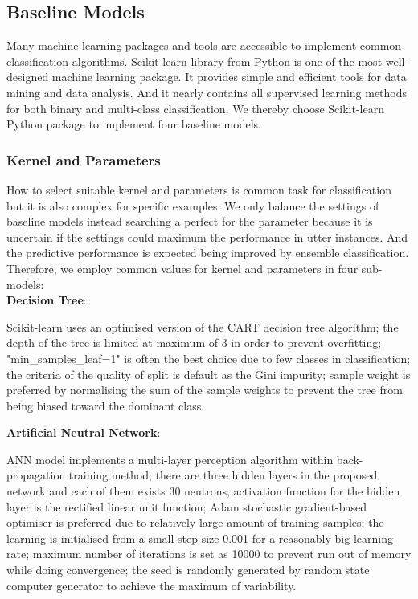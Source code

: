 \documentclass[10pt,journal,compsoc]{IEEEtran}
\begin{document}
\subsection{Baseline Models}
Many machine learning packages and tools are accessible to implement common classification algorithms. Scikit-learn library from Python is one of the most well-designed machine learning package. It provides simple and efficient tools for data mining and data analysis. And it nearly contains all supervised learning methods for both binary and multi-class classification. We thereby choose Scikit-learn Python package to implement four baseline models.

\subsubsection{Kernel and Parameters}
How to select suitable kernel and parameters is common task for classification but it is also complex for specific examples. We only balance the settings of baseline models instead searching a perfect for the parameter because it is uncertain if the settings could maximum the performance in utter instances. And the predictive performance is expected being improved by ensemble classification. Therefore, we employ common values for kernel and parameters in four sub-models:\\

\textbf{Decision Tree}:
		\begin{description} 
		\item \hspace{0.5cm} Scikit-learn uses an optimised version of the CART decision tree algorithm; 
		 the depth of the tree is limited at maximum of 3 in order to prevent overfitting; 
		 "min\_samples\_leaf=1" is often the best choice due to few classes in classification; 
		 the criteria of the quality of split is default as the Gini impurity; 
		 sample weight is preferred by normalising the sum of the sample weights to prevent the tree from being biased toward the dominant class.\\
		\end{description} 

	\textbf{Artificial Neutral Network}:
	\begin{description} 
		\item \hspace{0.5cm} ANN model implements a multi-layer perception algorithm within back-propagation training method; 
		 there are three hidden layers in the proposed network and each of them exists 30 neutrons;
		 activation function for the hidden layer is the rectified linear unit function; 
		 Adam stochastic gradient-based optimiser is preferred due to relatively large amount of training samples; 
		 the learning is initialised from a small step-size 0.001 for a reasonably big learning rate;	
		 maximum number of iterations is set as 10000 to prevent run out of memory while doing convergence; 
		 the seed is randomly generated by random state computer generator to achieve the maximum of variability.\\
	\end{description}
	
\end{document}
